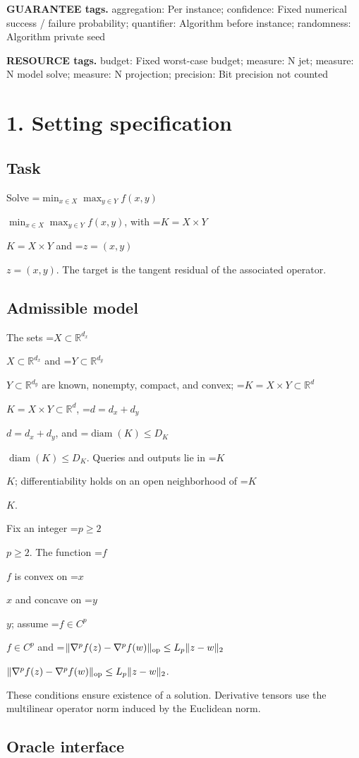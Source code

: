 \documentclass[10pt,a4paper]{article}
\newcommand{\AtlasMath}[1]{\par\begingroup\centering\setbox0=\hbox{$\displaystyle #1$}\ifdim\wd0>1.4\linewidth\typeout{ATLAS WIDE FORMULA: \the\wd0}\fi\ifdim\wd0>\linewidth\resizebox{\linewidth}{!}{\box0}\else\box0\fi\par\endgroup}
\newcommand{\AtlasInlineMath}[1]{\begingroup\setbox0=\hbox{$#1$}\ifdim\wd0>.4\linewidth\endgroup\AtlasMath{#1}\else\endgroup$#1$\fi}
\begin{document}
\textbf{GUARANTEE tags.} aggregation: Per instance; confidence: Fixed numerical success / failure probability; quantifier: Algorithm before instance; randomness: Algorithm private seed



\textbf{RESOURCE tags.} budget: Fixed worst-case budget; measure: N jet; measure: N model solve; measure: N projection; precision: Bit precision not counted



\section{1. Setting specification}


\subsection{Task}


Solve \AtlasInlineMath{\min_{x\in X}\max_{y\in Y}f(x,y)}, with \AtlasInlineMath{K=X\times Y} and \AtlasInlineMath{z=(x,y)}. The target is the tangent residual of the associated operator.



\subsection{Admissible model}


The sets \AtlasInlineMath{X\subset\mathbb R^{d_x}} and \AtlasInlineMath{Y\subset\mathbb R^{d_y}} are known, nonempty, compact, and convex; \AtlasInlineMath{K=X\times Y\subset\mathbb R^d}, \AtlasInlineMath{d=d_x+d_y}, and \AtlasInlineMath{\operatorname{diam}(K)\le D_K}. Queries and outputs lie in \AtlasInlineMath{K}; differentiability holds on an open neighborhood of \AtlasInlineMath{K}.



Fix an integer \AtlasInlineMath{p\ge2}. The function \AtlasInlineMath{f} is convex on \AtlasInlineMath{x} and concave on \AtlasInlineMath{y}; assume \AtlasInlineMath{f\in C^p} and \AtlasInlineMath{\|\nabla^p f(z)-\nabla^p f(w)\|_{\rm op}\le L_p\|z-w\|_2}.



These conditions ensure existence of a solution. Derivative tensors use the multilinear operator norm induced by the Euclidean norm.



\subsection{Oracle interface}
\end{document}
